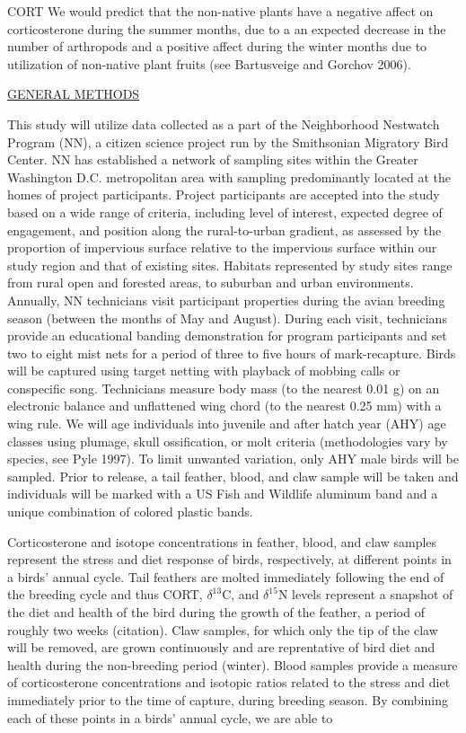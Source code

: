 \documentclass[12pt]{article}
\begin{document}
CORT
We would predict that the non-native plants have a negative affect on corticosterone during the summer months, due to a an expected decrease in the number of arthropods and a positive affect during the winter months due to utilization of non-native plant fruits (see Bartusveige and Gorchov 2006).


\noindent \underline{GENERAL METHODS}\par

This study will utilize data collected as a part of the Neighborhood Nestwatch Program (NN), a citizen science project run by the Smithsonian Migratory Bird Center. NN has established a network of sampling sites within the Greater Washington D.C. metropolitan area with sampling predominantly located at the homes of project participants. Project participants are accepted into the study based on a wide range of criteria, including level of interest, expected degree of engagement, and position along the rural-to-urban gradient, as assessed by the proportion of impervious surface relative to the impervious surface within our study region and that of existing sites. Habitats represented by study sites range from rural open and forested areas, to suburban and urban environments. Annually, NN technicians visit participant properties during the avian breeding season (between the months of May and August). During each visit, technicians provide an educational banding demonstration for program participants and set two to eight mist nets for a period of three to five hours of mark-recapture. Birds will be captured using target netting with playback of mobbing calls or conspecific song. Technicians measure body mass (to the nearest 0.01 g) on an electronic balance and unflattened wing chord (to the nearest 0.25 mm) with a wing rule. We will age individuals into juvenile and after hatch year (AHY) age classes using plumage, skull ossification, or molt criteria (methodologies vary by species, see Pyle 1997). To limit unwanted variation, only AHY male birds will be sampled. Prior to release, a  tail feather, blood, and claw sample will be taken and individuals will be marked with a US Fish and Wildlife aluminum band and a unique combination of colored plastic bands.\par

Corticosterone and isotope concentrations in feather, blood, and claw samples represent the stress and diet response of birds, respectively, at different points in a birds' annual cycle. Tail feathers are molted immediately following the end of the breeding cycle and thus CORT, $\delta^{13}$C, and $\delta^{15}$N levels represent a snapshot of the diet and health of the bird during the growth of the feather, a period of roughly two weeks (citation). Claw samples, for which only the tip of the claw will be removed, are grown continuously and are reprentative of bird diet and health during the non-breeding period (winter). Blood samples provide a measure of corticosterone concentrations and isotopic ratios related to the stress and diet immediately prior to the time of capture, during breeding season. By combining each of these points in a birds' annual cycle, we are able to 
\end{document}
